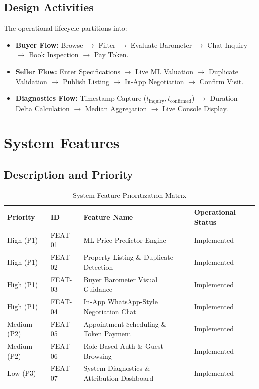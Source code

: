 \documentclass[11pt,a4paper]{article}
\begin{document}
\subsection{Design Activities}
The operational lifecycle partitions into:
\begin{itemize}[leftmargin=0.8cm]
    \item \textbf{Buyer Flow:} Browse $\rightarrow$ Filter $\rightarrow$ Evaluate Barometer $\rightarrow$ Chat Inquiry $\rightarrow$ Book Inspection $\rightarrow$ Pay Token.
    \item \textbf{Seller Flow:} Enter Specifications $\rightarrow$ Live ML Valuation $\rightarrow$ Duplicate Validation $\rightarrow$ Publish Listing $\rightarrow$ In-App Negotiation $\rightarrow$ Confirm Visit.
    \item \textbf{Diagnostics Flow:} Timestamp Capture ($t_{\text{inquiry}}, t_{\text{confirmed}}$) $\rightarrow$ Duration Delta Calculation $\rightarrow$ Median Aggregation $\rightarrow$ Live Console Display.
\end{itemize}

\newpage
\section{System Features}

\subsection{Description and Priority}
\begin{table}[htbp]
\centering
\begin{tabular}{@{}llll@{}}
\toprule
\textbf{Priority} & \textbf{ID} & \textbf{Feature Name} & \textbf{Operational Status} \\ \midrule
High (P1) & FEAT-01 & ML Price Predictor Engine & Implemented \\
High (P1) & FEAT-02 & Property Listing \& Duplicate Detection & Implemented \\
High (P1) & FEAT-03 & Buyer Barometer Visual Guidance & Implemented \\
High (P1) & FEAT-04 & In-App WhatsApp-Style Negotiation Chat & Implemented \\
Medium (P2) & FEAT-05 & Appointment Scheduling \& Token Payment & Implemented \\
Medium (P2) & FEAT-06 & Role-Based Auth \& Guest Browsing & Implemented \\
Low (P3) & FEAT-07 & System Diagnostics \& Attribution Dashboard & Implemented \\ \bottomrule
\end{tabular}
\caption{System Feature Prioritization Matrix}
\label{tab:features}
\end{table}
\end{document}
